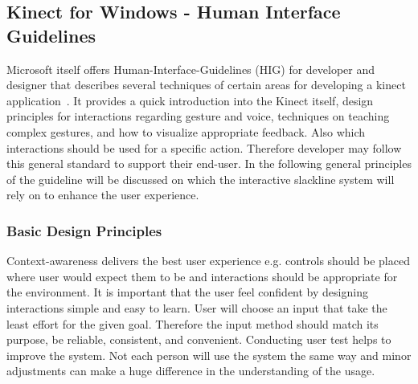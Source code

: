 \subsection{Kinect for Windows - Human Interface Guidelines}\label{2_5_2_kinectHIG}
Microsoft itself offers Human-Interface-Guidelines (HIG) for developer and designer that describes several techniques of certain areas for developing a kinect application~\cite{MicrosoftHIG2014-mh}. It provides a quick introduction into the Kinect itself, design principles for interactions regarding gesture and voice, techniques on teaching complex gestures, and how to visualize appropriate feedback. Also which interactions should be used for a specific action. Therefore developer may follow this general standard to support their end-user. In the following general principles of the guideline will be discussed on which the interactive slackline system will rely on to enhance the user experience. 

\subsubsection{Basic Design Principles}
Context-awareness delivers the best user experience e.g. controls should be placed where user would expect them to be and interactions should be appropriate for the environment. It is important that the user feel confident by designing interactions simple and easy to learn. User will choose an input that take the least effort for the given goal. Therefore the input method should match its purpose, be reliable, consistent, and convenient. Conducting user test helps to improve the system. Not each person will use the system the same way and minor adjustments can make a huge difference in the understanding of the usage.


